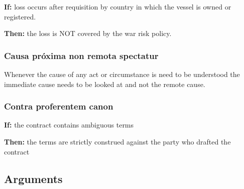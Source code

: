     \textbf{If:} loss occurs after requisition by country in which the vessel is owned or registered.
    
    \textbf{Then:} the loss is NOT covered by the war risk policy.

\subsubsection{Causa próxima non remota spectatur}

Whenever the cause of any act or circumstance is need to be understood the immediate cause needs to be looked at and not the remote cause.  \cite{standard_oil_v_united_states}
\cite{lanasa_v_importing}
\cite{arnould_marine_insurance}

\subsubsection{Contra proferentem canon}

    \textbf{If: } the contract contains ambiguous terms
    
    \textbf{Then:} the terms are strictly construed against the party who drafted the contract

% 
% 
% 
% 
% 
% 
% 
     
\subsection{Arguments}
     
